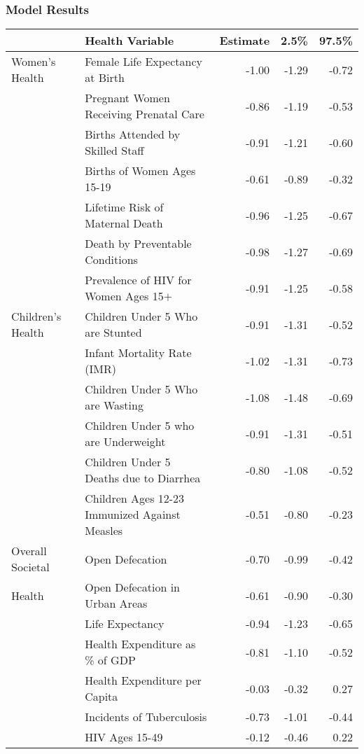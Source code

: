 \documentclass{beamer}
\begin{document}
\begin{frame}
\frametitle{Model Results}
\begin{table}[htb]
\renewcommand\thetable{3.1}
       \tiny
    \centering
    \begin{tabular}{l|l|r|r|r}
    & \textbf{Health Variable} & \textbf{Estimate} & \textbf{2.5\%} & \textbf{97.5\%} \\
    \hline
    \hline
    Women's Health & Female Life Expectancy at Birth &  -1.00 & -1.29 & -0.72 \\ 
     & Pregnant Women Receiving Prenatal Care & -0.86 & -1.19 & -0.53 \\ 
     & Births Attended by Skilled Staff  & -0.91 & -1.21 & -0.60 \\ 
     & Births of Women Ages 15-19  & -0.61 & -0.89 & -0.32 \\ 
     & Lifetime Risk of Maternal Death  & -0.96 & -1.25 & -0.67 \\
     & Death by Preventable Conditions  & -0.98 & -1.27 & -0.69 \\ 
     & Prevalence of HIV for Women Ages 15$+$  &  -0.91 & -1.25 & -0.58 \\
     \hline
     Children's Health & Children Under 5 Who are Stunted  &  -0.91 & -1.31 & -0.52 \\
     & Infant Mortality Rate (IMR)  & -1.02 & -1.31 & -0.73 \\  
     & Children Under 5 Who are Wasting  & -1.08 & -1.48 & -0.69 \\
     & Children Under 5 who are Underweight  &  -0.91 & -1.31 & -0.51 \\ 
     & Children Under 5 Deaths due to Diarrhea  & -0.80 & -1.08 & -0.52 \\
     & Children Ages 12-23 Immunized Against Measles  &  -0.51 & -0.80 & -0.23 \\
     \hline
     Overall Societal & Open Defecation  &  -0.70 & -0.99 & -0.42 \\ 
     Health & Open Defecation in Urban Areas  & -0.61 & -0.90 & -0.30 \\  
     & Life Expectancy  & -0.94 & -1.23 & -0.65 \\
     & Health Expenditure as \% of GDP & -0.81 & -1.10 & -0.52 \\ 
     & Health Expenditure per Capita  & -0.03 & -0.32 & 0.27 \\
     & Incidents of Tuberculosis  & -0.73 & -1.01 & -0.44 \\
     & HIV Ages 15-49  & -0.12 & -0.46 & 0.22 \\ 

\end{tabular}
\end{table}
\end{frame}
\end{document}
